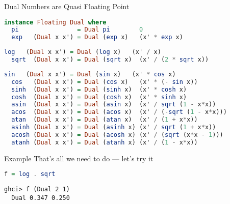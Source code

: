 \documentclass{beamer}
\begin{document}
\begin{frame}[fragile]{Dual Numbers are Quasi Floating Point}
\begin{scriptsize}
\begin{lstlisting}[language=Haskell]
instance Floating Dual where
  pi                = Dual pi        0
  exp   (Dual x x') = Dual (exp x)   (x' * exp x)
\end{lstlisting}
\color{blue}
\begin{lstlisting}[language=Haskell]
  log   (Dual x x') = Dual (log x)   (x' / x)
  sqrt  (Dual x x') = Dual (sqrt x)  (x' / (2 * sqrt x))
\end{lstlisting}
\color{black}
\begin{lstlisting}[language=Haskell]
  sin   (Dual x x') = Dual (sin x)   (x' * cos x)
  cos   (Dual x x') = Dual (cos x)   (x' * (- sin x))
  sinh  (Dual x x') = Dual (sinh x)  (x' * cosh x)
  cosh  (Dual x x') = Dual (cosh x)  (x' * sinh x)
  asin  (Dual x x') = Dual (asin x)  (x' / sqrt (1 - x*x))
  acos  (Dual x x') = Dual (acos x)  (x' / (-sqrt (1 - x*x)))
  atan  (Dual x x') = Dual (atan x)  (x' / (1 + x*x))
  asinh (Dual x x') = Dual (asinh x) (x' / sqrt (1 + x*x))
  acosh (Dual x x') = Dual (acosh x) (x' / (sqrt (x*x - 1)))
  atanh (Dual x x') = Dual (atanh x) (x' / (1 - x*x))
\end{lstlisting}
\end{scriptsize}
\end{frame}


\begin{frame}[fragile]{Example}
That's all we need to do --- let's try it

\begin{scriptsize}
\begin{lstlisting}[language=Haskell]
f = log . sqrt
\end{lstlisting}
\end{scriptsize}

\begin{scriptsize}
\begin{lstlisting}
ghci> f (Dual 2 1)
  Dual 0.347 0.250
\end{lstlisting}
\end{scriptsize}
\end{frame}
\end{document}
